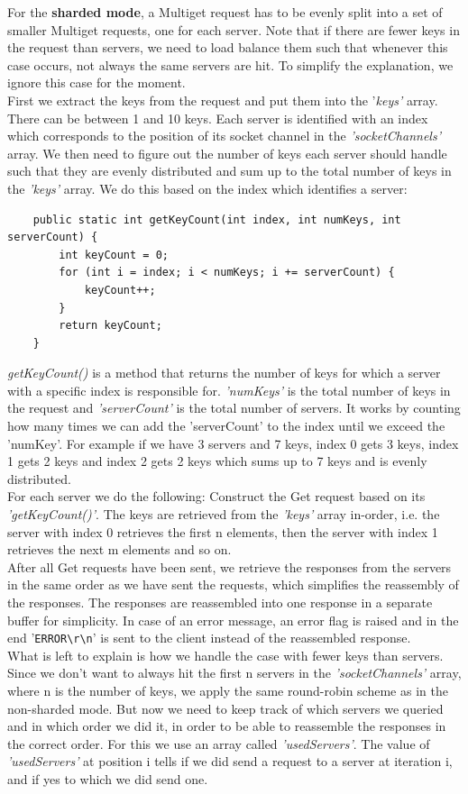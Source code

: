 For the \textbf{sharded mode}, a Multiget request has to be evenly split into a set of smaller Multiget requests, one for each server. Note that if there are fewer keys in the request than servers, we need to load balance them such that whenever this case occurs, not always the same servers are hit. To simplify the explanation, we ignore this case for the moment. \\
First we extract the keys from the request and put them into the '\textit{keys'} array. There can be between 1 and 10 keys. Each server is identified with an index which corresponds to the position of its socket channel in the \textit{'socketChannels'} array. We then need to figure out the number of keys each server should handle such that they are evenly distributed and sum up to the total number of keys in the \textit{'keys'} array. We do this based on the index which identifies a server: 
\begin{verbatim}
    public static int getKeyCount(int index, int numKeys, int serverCount) {
        int keyCount = 0;
        for (int i = index; i < numKeys; i += serverCount) {
            keyCount++;
        }
        return keyCount;
    }
\end{verbatim}
\textit{getKeyCount()} is a method that returns the number of keys for which a server with a specific index is responsible for. \textit{'numKeys'} is the total number of keys in the request and \textit{'serverCount'} is the total number of servers. It works by counting how many times we can add the 'serverCount' to the index until we exceed the 'numKey'. For example if we have 3 servers and 7 keys, index 0 gets 3 keys, index 1 gets 2 keys and index 2 gets 2 keys which sums up to 7 keys and is evenly distributed. \\
For each server we do the following: Construct the Get request based on its \textit{'getKeyCount()'}. The keys are retrieved from the \textit{'keys'} array in-order, i.e. the server with index 0 retrieves the first n elements, then the server with index 1 retrieves the next m elements and so on. \\
After all Get requests have been sent, we retrieve the responses from the servers in the same order as we have sent the requests, which simplifies the reassembly of the responses. The responses are reassembled into one response in a separate buffer for simplicity. In case of an error message, an error flag is raised and in the end '\texttt{ERROR}\texttt{\textbackslash r\textbackslash n}' is sent to the client instead of the reassembled response. \\
What is left to explain is how we handle the case with fewer keys than servers. Since we don't want to always hit the first n servers in the \textit{'socketChannels'} array, where n is the number of keys, we apply the same round-robin scheme as in the non-sharded mode. But now we need to keep track of which servers we queried and in which order we did it, in order to be able to reassemble the responses in the correct order. For this we use an array called \textit{'usedServers'}. The value of \textit{'usedServers'} at position i tells if we did send a request to a server at iteration i, and if yes to which we did send one. 

